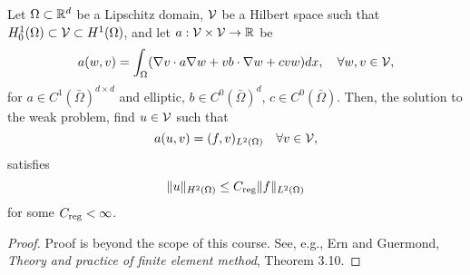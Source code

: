\begin{lemma}
  \label{lemma:th_elliptic_reg}
  Let $\Omega \subset \mathbb{R}^d$ be a Lipschitz domain, $\mathcal{V}$ be a Hilbert space such that $H_0^1(\Omega) \subset \mathcal{V} \subset H^1(\Omega)$, and let $a: \mathcal{V} \times \mathcal{V} \to \mathbb{R}$ be
  \begin{equation*}
    a(w,v) = \int_\Omega (\nabla v \cdot a \nabla w + v b \cdot \nabla w + c v w) dx,  \quad \forall w, v \in \mathcal{V},
  \end{equation*}
  for $a \in C^{1}(\bar \Omega)^{d \times d}$ and elliptic, $b \in C^0(\bar \Omega)^d$, $c \in C^0(\bar \Omega)$.  Then, the solution to the weak problem, find $u \in \mathcal{V}$ such that
  \begin{equation*}
    a(u,v) = (f,v)_{L^2(\Omega)} \quad \forall v \in \mathcal{V},
  \end{equation*}
  satisfies
  \begin{equation*}
    \| u \|_{H^2(\Omega)} \leq C_{\rm reg} \| f \|_{L^2(\Omega)}
  \end{equation*}
  for some $C_{\rm reg} < \infty$.
  \begin{proof}
    Proof is beyond the scope of this course.  See, e.g., Ern and Guermond, \emph{Theory and practice of finite element method}, Theorem 3.10.
  \end{proof}
\end{lemma}

